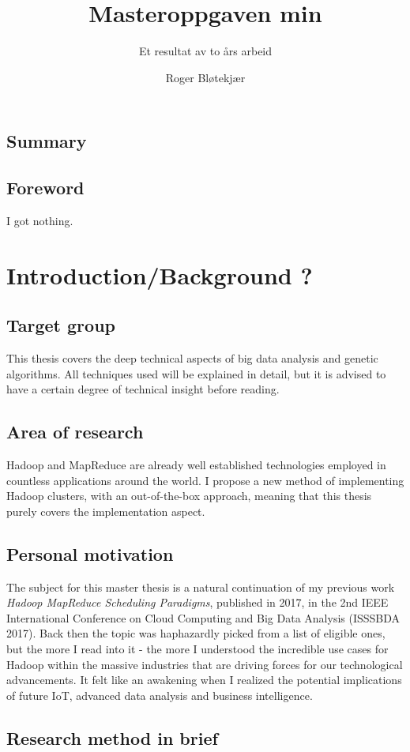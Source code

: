 \documentclass[a4paper,english]{report}
\title{Masteroppgaven min}
\subtitle{Et resultat av to års arbeid}
\author{Roger Bløtekjær}
\begin{document}
	\duoforside[dept={Institutt for informatikk},
	program={Informatikk: språkteknologi},
	short]
	\section{Summary}
	\section{Foreword}
	I got nothing.
	\tableofcontents
	\chapter{Introduction/Background ?}
		\section{Target group}
		This thesis covers the deep technical aspects of big data analysis and genetic algorithms. All techniques used will be explained in detail, but it is advised to have a certain degree of technical insight before reading.
		\section{Area of research}
		Hadoop and MapReduce are already well established technologies employed in countless applications around the world. I propose a new method of implementing Hadoop clusters, with an out-of-the-box approach, meaning that this thesis purely covers the implementation aspect.
		\section{Personal motivation}
		The subject for this master thesis is a natural continuation of my previous work \emph{Hadoop MapReduce Scheduling Paradigms}, published in 2017, in the 2nd IEEE International Conference on Cloud Computing and Big Data Analysis (ISSSBDA 2017). Back then the topic was haphazardly picked from a list of eligible ones, but the more I read into it - the more I understood the incredible use cases for Hadoop within the massive industries that are driving forces for our technological advancements. It felt like an awakening when I realized the potential implications of future IoT, advanced data analysis and business intelligence.
		\section{Research method in brief}
		
\end{document}
